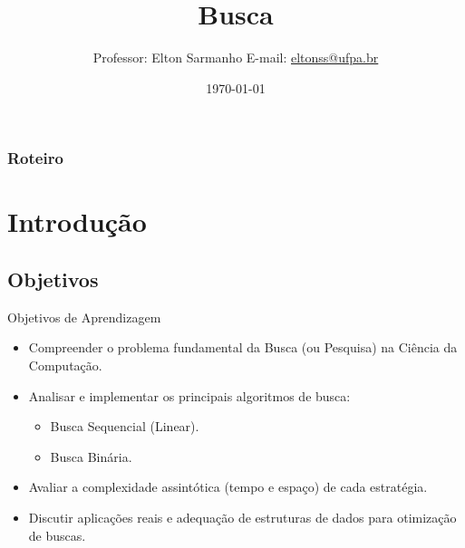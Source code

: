 \documentclass{beamer}
\title[Estrutura de Dados I]{Busca}
\author[Elton Sarmanho]{ 
Professor: Elton Sarmanho\inst{1} 
\newline
E-mail: \href{mailto:eltonss@ufpa.br}{eltonss@ufpa.br}\newline
\href{https://github.com/eltonsarmanho}{\faGithub} \href{https://www.linkedin.com/in/elton-sarmanho-836553185/}{\faLinkedinSquare}
}
\institute[UFPA]{
   \inst{1}%
     Faculdade de Sistemas de Informação - UFPA/CUTINS
     }
\date{\today}
\begin{document}
\begin{frame}
\titlepage
\end{frame}

\begin{frame}
\frametitle{Roteiro}
\tableofcontents
\end{frame}


\section{Introdução}
\subsection{Objetivos}
\begin{frame}{Objetivos de Aprendizagem}
\begin{itemize}
    \item Compreender o problema fundamental da Busca (ou Pesquisa) na Ciência da Computação. \pause
    \item Analisar e implementar os principais algoritmos de busca:
    \begin{itemize}
        \item Busca Sequencial (Linear).
        \item Busca Binária.
    \end{itemize} \pause
    \item Avaliar a complexidade assintótica (tempo e espaço) de cada estratégia. \pause
    \item Discutir aplicações reais e adequação de estruturas de dados para otimização de buscas.
\end{itemize}
\end{frame}
\end{document}
